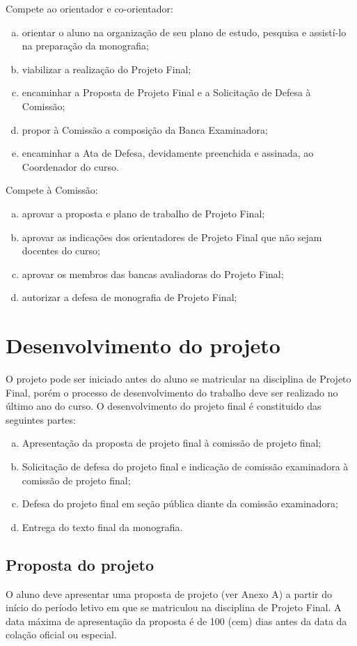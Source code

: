 Compete ao orientador e co-orientador:
\begin{enumerate}[a.]
\item orientar o aluno na organização de seu plano de estudo, pesquisa e assistí-lo na preparação da monografia;
\item viabilizar a realização do Projeto Final;
\item encaminhar a Proposta de Projeto Final e a Solicitação de Defesa à Comissão;
\item propor à Comissão a composição da Banca Examinadora;
\item encaminhar a Ata de Defesa, devidamente preenchida e assinada, ao Coordenador do curso.
\end{enumerate}

Compete à Comissão:
\begin{enumerate}[a.]
\item aprovar a proposta e plano de trabalho de Projeto Final;
\item aprovar as indicações dos orientadores de Projeto Final que não sejam docentes do curso;
\item aprovar os membros das bancas avaliadoras do Projeto Final;
\item autorizar a defesa de monografia de Projeto Final;
\end{enumerate}

\section{Desenvolvimento do projeto}

O projeto pode ser iniciado antes do aluno se matricular na disciplina de Projeto Final, porém o 
processo de desenvolvimento do trabalho deve ser realizado no último ano do curso. O desenvolvimento
do projeto final é constituido das seguintes partes:

\begin{enumerate}[a.]
\item Apresentação da proposta de projeto final à comissão de projeto final;
\item Solicitação de defesa do projeto final e indicação de comissão examinadora à comissão de projeto final;
\item Defesa do projeto final em seção pública diante da comissão examinadora;
\item Entrega do texto final da monografia.
\end{enumerate}


\subsection{Proposta do projeto} 
\label{sec:proposta}
O aluno deve apresentar uma proposta de projeto (ver Anexo A) a partir do início do período
letivo em que se matriculou na disciplina de Projeto Final. A data máxima de apresentação da
proposta é de 100 (cem) dias antes da data da colação oficial ou especial.

